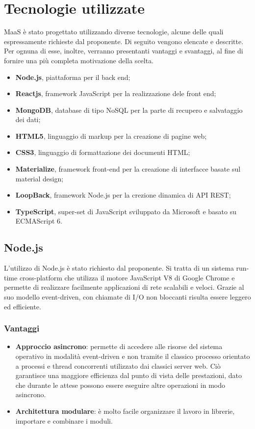 \section{Tecnologie utilizzate}
MaaS \`e stato progettato utilizzando diverse tecnologie, alcune delle quali espressamente richieste dal proponente. Di seguito vengono elencate e descritte. Per ognuna di esse, inoltre, verranno presentanti vantaggi e svantaggi, al fine di fornire una pi\`u completa motivazione della scelta.
\begin{itemize}
\item \textbf{Node.js}, piattaforma per il back end;
\item \textbf{Reactjs}, framework JavaScript per la realizzazione dele front end;
\item \textbf{MongoDB}, database di tipo NoSQL per la parte di recupero e salvataggio dei dati;
\item \textbf{HTML5}, linguaggio di markup per la creazione di pagine web;
\item \textbf{CSS3}, linguaggio di formattazione dei documenti HTML;
\item \textbf{Materialize}, framework front-end per la creazione di interfacce basate sul material design;
\item \textbf{LoopBack}, framework Node.js per la crezione dinamica di API REST;
\item \textbf{TypeScript}, super-set di JavaScript sviluppato da Microsoft e basato su ECMAScript 6.
\end{itemize}
\subsection{Node.js}
L'utilizzo di Node.js \`e stato richiesto dal proponente. Si tratta di un sistema run-time cross-platform che utilizza il motore JavaScript V8 di Google Chrome e permette di realizzare facilmente applicazioni di rete scalabili e veloci. Grazie al suo modello event-driven, con chiamate di I/O non bloccanti risulta essere leggero ed efficiente.
\subsubsection{Vantaggi}
\begin{itemize}
\item \textbf{Approccio asincrono}: permette di accedere alle risorse del sistema operativo in modalit\`a event-driven e non tramite il classico processo orientato a processi e thread concorrenti utilizzato dai classici server web. Ci\`o garantisce una maggiore efficienza dal punto di vista delle prestazioni, dato che durante le attese possono essere eseguire altre operazioni in modo asincrono.
\item \textbf{Architettura modulare}: \`e molto facile organizzare il lavoro in librerie, importare e combinare i moduli.
\end{itemize}
